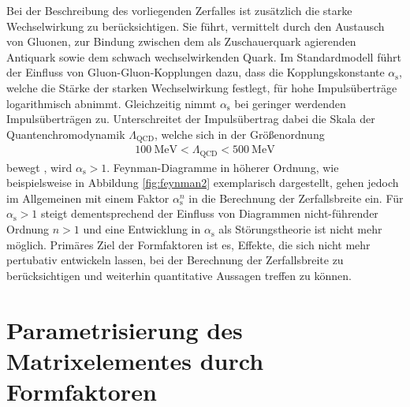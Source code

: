 Bei der Beschreibung des vorliegenden Zerfalles ist zusätzlich die starke Wechselwirkung zu berücksichtigen.
Sie führt, vermittelt durch den Austausch von Gluonen, zur Bindung zwischen dem als Zuschauerquark agierenden Antiquark sowie dem schwach wechselwirkenden Quark.
Im Standardmodell führt der Einfluss von Gluon-Gluon-Kopplungen dazu, dass die Kopplungskonstante $\alpha_\text{s}$, welche die Stärke der starken Wechselwirkung festlegt, für hohe Impulsüberträge logarithmisch abnimmt.
Gleichzeitig nimmt $\alpha_\text{s}$ bei geringer werdenden Impulsüberträgen zu.
Unterschreitet der Impulsübertrag dabei die Skala der Quantenchromodynamik $\Lambda_\text{QCD}$, welche sich in der Größenordnung
\begin{align*}
  \SI{100}{\mega\electronvolt} < \Lambda_\text{QCD} < \SI{500}{\mega\electronvolt}
\end{align*}
bewegt \cite{griffiths2008introduction}, wird $\alpha_\text{s} > 1$.
Feynman-Diagramme in höherer Ordnung, wie beispielsweise in Abbildung \ref{fig:feynman2} exemplarisch dargestellt, gehen jedoch im Allgemeinen mit einem Faktor $\alpha_\text{s}^n$ in die Berechnung der Zerfallsbreite ein.
Für $\alpha_\text{s} > 1$ steigt dementsprechend der Einfluss von Diagrammen nicht-führender Ordnung $n>1$ und eine Entwicklung in $\alpha_\text{s}$ als Störungstheorie ist nicht mehr möglich.
Primäres Ziel der Formfaktoren ist es, Effekte, die sich nicht mehr pertubativ entwickeln lassen, bei der Berechnung der Zerfallsbreite zu berücksichtigen und weiterhin quantitative Aussagen treffen zu können.

\section{Parametrisierung des Matrixelementes durch Formfaktoren}

